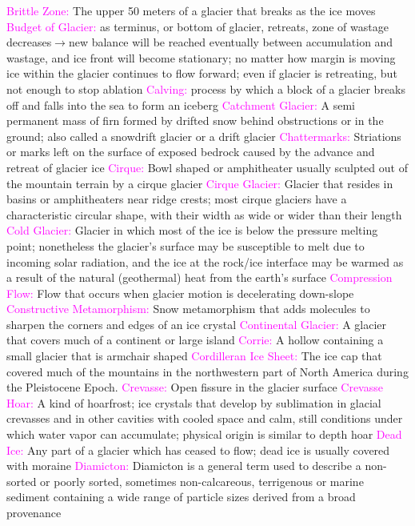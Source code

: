 \documentclass{article}
\newcommand{\pink}[1]{\textcolor{magenta}{#1}}
\newcommand{\vocab}[1]{{\pink{#1}}}
\begin{document}
\begin{multicols*}{4}
		\vocab{       Brittle Zone: }The upper 50 meters of a glacier that breaks as the ice moves
		\vocab{Budget of Glacier: } as terminus, or bottom of glacier, retreats, zone of wastage decreases$ \rightarrow $new balance will be reached eventually between accumulation and wastage, and ice front will become stationary; no matter how margin is moving ice within the glacier continues to flow forward; even if glacier is retreating, but not enough to stop ablation  
		\vocab{Calving: } process by which a block of a glacier breaks off and falls into the sea to form an iceberg  
		\vocab{        Catchment Glacier: } A semi permanent mass of firn formed by drifted snow behind obstructions or in the ground; also called a snowdrift glacier or a drift glacier 
		\vocab{        Chattermarks: } Striations or marks left on the surface of exposed bedrock caused by the advance and retreat of glacier ice 
		\vocab{        Cirque: } Bowl shaped or amphitheater usually sculpted out of the mountain terrain by a cirque glacier 
		\vocab{        Cirque Glacier: } Glacier that resides in basins or amphitheaters near ridge crests; most cirque glaciers have a characteristic circular shape, with their width as wide or wider than their length 
		\vocab{        Cold Glacier: } Glacier in which most of the ice is below the pressure melting point; nonetheless the glacier’s surface may be susceptible to melt due to incoming solar radiation, and the ice at the rock/ice interface may be warmed as a result of the natural (geothermal) heat from the earth’s surface 
		\vocab{        Compression Flow: } Flow that occurs when glacier motion is decelerating down-slope 
		\vocab{        Constructive Metamorphism: } Snow metamorphism that adds molecules to sharpen the corners and edges of an ice crystal 
		\vocab{ Continental Glacier: }A glacier that covers much of a continent or large island  
		\vocab{Corrie: } A hollow containing a small glacier that is armchair shaped  
		\vocab{Cordilleran Ice Sheet: }The ice cap that covered much of the mountains in the northwestern part of North America during the Pleistocene Epoch.  
		\vocab{        Crevasse: } Open fissure in the glacier surface 
		\vocab{        Crevasse Hoar: } A kind of hoarfrost; ice crystals that develop by sublimation in glacial crevasses and in other cavities with cooled space and calm, still conditions under which water vapor can accumulate; physical origin is similar to depth hoar 
		\vocab{        Dead Ice: } Any part of a glacier which has ceased to flow; dead ice is usually covered with moraine 
		\vocab{Diamicton: } Diamicton is a general term used to describe a non-sorted or poorly sorted, sometimes non-calcareous, terrigenous or marine sediment containing a wide range of particle sizes derived from a broad provenance  

\end{multicols*}
\end{document}
